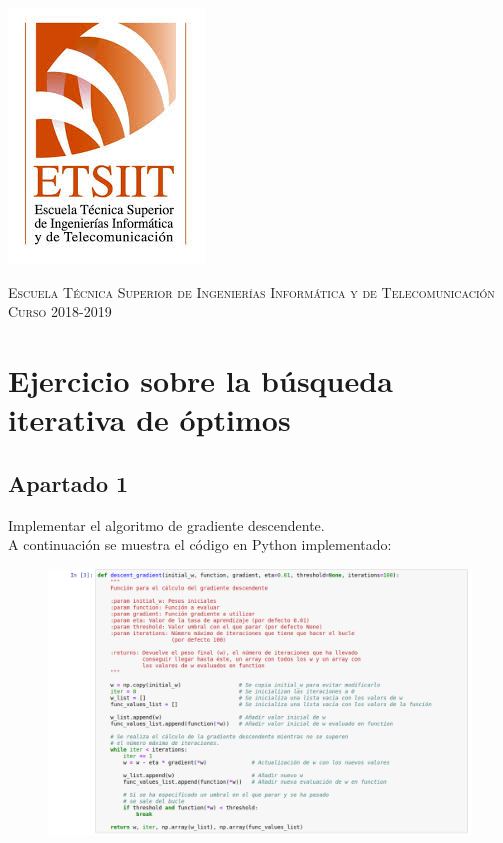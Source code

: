 \documentclass[11pt,a4paper]{article}
\begin{document}
\begin{titlepage}
\begin{minipage}{\textwidth}
\includegraphics[scale=0.3]{img/etsiit.jpeg}

\vspace{0.7cm}
\textsc{Escuela Técnica Superior de Ingenierías Informática y de Telecomunicación}\\
\vspace{1cm}
\textsc{Curso 2018-2019}
\end{minipage}
\end{titlepage}

\tableofcontents
\thispagestyle{empty}				%

\newpage

\section{Ejercicio sobre la búsqueda iterativa de óptimos}

\subsection*{Apartado 1}
\noindent Implementar el algoritmo de gradiente descendente. \\

A continuación se muestra el código en Python implementado:

\begin{figure}[H]
\centering
\includegraphics[scale=0.4]{img/descent_gradient_implementation.png}
\end{figure}
\end{document}
